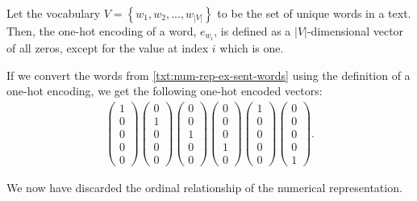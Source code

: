Let the vocabulary $V = \left \{ w_1, w_2, ..., w_{|V|} \right \}$ to be the set of unique words in a text. Then, the one-hot encoding of a word, $e_{w_i}$, is defined as a $|V|$-dimensional vector of all zeros, except for the value at index $i$ which is one.

If we convert the words from \cref{txt:num-rep-ex-sent-words} using the definition of a one-hot encoding, we get the following one-hot encoded vectors:
\begin{align}
    \begin{pmatrix}
    1\\
    0\\
    0\\
    0\\
    0
    \end{pmatrix}
    \begin{pmatrix}
    0\\
    1\\
    0\\
    0\\
    0
    \end{pmatrix}
    \begin{pmatrix}
    0\\
    0\\
    1\\
    0\\
    0
    \end{pmatrix}
    \begin{pmatrix}
    0\\
    0\\
    0\\
    1\\
    0
    \end{pmatrix}
    \begin{pmatrix}
    1\\
    0\\
    0\\
    0\\
    0
    \end{pmatrix}
    \begin{pmatrix}
    0\\
    0\\
    0\\
    0\\
    1
    \end{pmatrix}.
\end{align}

We now have discarded the ordinal relationship of the numerical representation.

